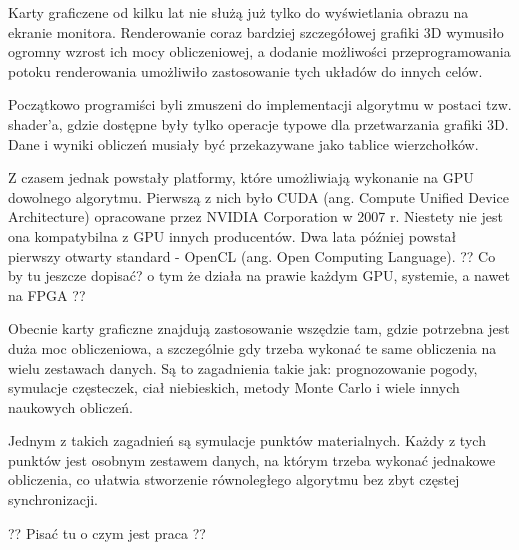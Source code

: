 


Karty graficzene od kilku lat nie służą już tylko do wyświetlania obrazu na ekranie monitora. Renderowanie coraz bardziej szczegółowej grafiki 3D wymusiło ogromny wzrost ich mocy obliczeniowej, a dodanie możliwości przeprogramowania potoku renderowania umożliwiło zastosowanie tych układów do innych celów.

Początkowo programiści byli zmuszeni do implementacji algorytmu w postaci tzw. shader'a, gdzie dostępne były tylko operacje typowe dla  przetwarzania grafiki 3D. Dane i wyniki obliczeń musiały być przekazywane jako tablice wierzchołków.

Z czasem jednak powstały platformy, które umożliwiają wykonanie na GPU dowolnego algorytmu. Pierwszą z nich było CUDA (ang. Compute Unified Device Architecture) opracowane przez NVIDIA Corporation w 2007 r. Niestety nie jest ona kompatybilna z GPU innych producentów. 
Dwa lata później powstał pierwszy otwarty standard - OpenCL (ang. Open Computing Language). ?? Co by tu jeszcze dopisać? o tym że działa na prawie każdym GPU, systemie, a nawet na FPGA ?? \linebreak

Obecnie karty graficzne znajdują zastosowanie wszędzie tam, gdzie potrzebna jest duża moc obliczeniowa, a szczególnie gdy trzeba wykonać te same obliczenia na wielu zestawach danych.
Są to zagadnienia takie jak: prognozowanie pogody, symulacje częsteczek, ciał niebieskich, metody Monte Carlo i wiele innych naukowych obliczeń. \linebreak %





Jednym z takich zagadnień są symulacje punktów materialnych. 
Każdy z tych punktów jest osobnym zestawem danych, na którym trzeba wykonać jednakowe obliczenia, co ułatwia stworzenie równoległego algorytmu bez zbyt częstej synchronizacji.


?? Pisać tu o czym jest praca ??



